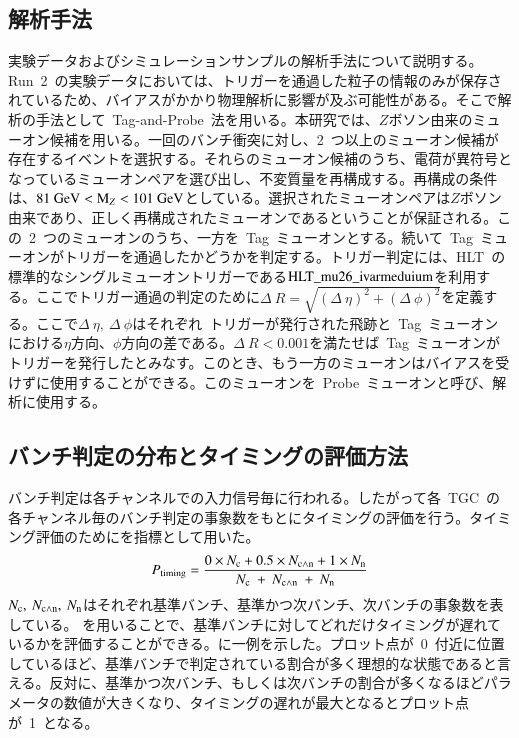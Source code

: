 \subsection{解析手法}\label{subsec:tag}
実験データおよびシミュレーションサンプルの解析手法について説明する。
Run~2~の実験データにおいては、トリガーを通過した粒子の情報のみが保存されているため、バイアスがかかり物理解析に影響が及ぶ可能性がある。そこで解析の手法として~Tag-and-Probe~法を用いる。本研究では、$Z$ボソン由来のミューオン候補を用いる。一回のバンチ衝突に対し、2~つ以上のミューオン候補が存在するイベントを選択する。それらのミューオン候補のうち、電荷が異符号となっているミューオンペアを選び出し、不変質量を再構成する。再構成の条件は、$81~\rm{GeV}<M_{\it{Z}}<101~\rm{GeV}$としている。選択されたミューオンペアは$Z$ボソン由来であり、正しく再構成されたミューオンであるということが保証される。この~2~つのミューオンのうち、一方を~Tag~ミューオンとする。続いて~Tag~ミューオンがトリガーを通過したかどうかを判定する。トリガー判定には、HLT~の標準的なシングルミューオントリガーである$\rm{HLT\_mu26\_ivarmeduium}$を利用する。ここでトリガー通過の判定のために$\Delta~R=\sqrt{(\Delta~\eta)^2+(\Delta~\phi)^2}$を定義する。ここで$\Delta~\eta,~\Delta~\phi$はそれぞれ~トリガーが発行された飛跡と~Tag~ミューオンにおける$\eta$方向、$\phi$方向の差である。$\Delta~R<0.001$を満たせば~Tag~ミューオンがトリガーを発行したとみなす。このとき、もう一方のミューオンはバイアスを受けずに使用することができる。このミューオンを~Probe~ミューオンと呼び、解析に使用する。

\subsection{バンチ判定の分布とタイミングの評価方法}
バンチ判定は各チャンネルでの入力信号毎に行われる。したがって各~TGC~の各チャンネル毎のバンチ判定の事象数をもとにタイミングの評価を行う。タイミング評価のためにを指標として用いた。
\begin{align}
    \it{P_{\rm{timing}}}=\frac{\rm{0}\times\it{N_{\rm{c}}}+\rm{0.5}\times\it{N_{\rm{c{\land}n}}}+\rm{1}\times\it{N_{\rm{n}}}}{\it{N_{\rm{c}}}~+~\it{N_{\rm{c{\land}n}}}~+~\it{N_{\rm{n}}}} \label{eq:timing}
\end{align}
$\it{N_{\rm{c}}},~\it{N_{\rm{c{\land}n}}},~\it{N_{\rm{n}}}$はそれぞれ基準バンチ、基準かつ次バンチ、次バンチの事象数を表している。
を用いることで、基準バンチに対してどれだけタイミングが遅れているかを評価することができる。に一例を示した。プロット点が~0~付近に位置しているほど、基準バンチで判定されている割合が多く理想的な状態であると言える。反対に、基準かつ次バンチ、もしくは次バンチの割合が多くなるほどパラメータの数値が大きくなり、タイミングの遅れが最大となるとプロット点が~1~となる。

